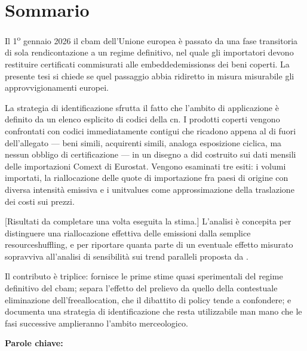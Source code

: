 \chapter*{Sommario}

Il 1\textsuperscript{o} gennaio 2026 il \acrfull{cbam} dell'Unione europea è
passato da una fase transitoria di sola rendicontazione a un regime definitivo,
nel quale gli importatori devono restituire certificati commisurati alle
\glspl{embeddedemissions} dei beni coperti. La presente tesi si chiede se
quel passaggio abbia ridiretto in misura misurabile gli approvvigionamenti
europei.

La strategia di identificazione sfrutta il fatto che l'ambito di applicazione
è definito da un elenco esplicito di codici della \acrshort{cn}. I prodotti
coperti vengono confrontati con codici immediatamente contigui che ricadono
appena al di fuori dell'allegato --- beni simili, acquirenti simili, analoga
esposizione ciclica, ma nessun obbligo di certificazione --- in un disegno a
\acrfull{did} costruito sui dati mensili delle importazioni Comext di Eurostat.
Vengono esaminati tre esiti: i volumi importati, la riallocazione delle quote
di importazione fra paesi di origine con diversa intensità emissiva e i
\glspl{unitvalue} come approssimazione della traslazione dei costi sui prezzi.

[Risultati da completare una volta eseguita la stima.] L'analisi è concepita
per distinguere una riallocazione effettiva delle emissioni dalla semplice
\gls{resourceshuffling}, e per riportare quanta parte di un eventuale effetto
misurato sopravviva all'analisi di sensibilità sui trend paralleli proposta da
\textcite{rambachan2023}.

Il contributo è triplice: fornisce le prime stime quasi sperimentali del
regime definitivo del \acrshort{cbam}; separa l'effetto del prelievo da quello
della contestuale eliminazione dell'\gls{freeallocation}, che il dibattito di
policy tende a confondere; e documenta una strategia di identificazione che
resta utilizzabile man mano che le fasi successive amplieranno l'ambito
merceologico.

\medskip
\noindent\textbf{Parole chiave:} \thesisKeywords
